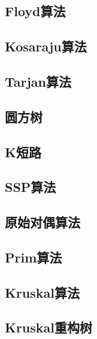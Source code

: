 \documentclass[twocolumn,a4]{article}  %
\begin{document}
		\subsection{Floyd算法}
	 	 	
	 	 	
		\subsection{Kosaraju算法}
	 	 	
	 	 	
	 	\subsection{Tarjan算法}
	 	 	
	 	 	
	 	\subsection{圆方树}
	 	 	
	 	 	
		\subsection{K短路}
	 	 	
	 	 	
		\subsection{SSP算法}
	 	 	
	 	 	
		\subsection{原始对偶算法}
	 	 	
	 	 	
		\subsection{Prim算法}
	 	 	
	 	 	
		\subsection{Kruskal算法}
	 	 	
	 	 	
		\subsection{Kruskal重构树}
	 	 	
	 	 	
\end{document}

